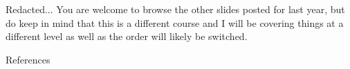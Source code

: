 \documentclass[11pt]{beamer}
\begin{document}
\begin{frame}{Redacted...}
  You are welcome to browse the other slides posted for last year, but do keep in mind that this is a different
  course and I will be covering things at a different level as well as the order will likely be switched.
\end{frame}

%

\begin{frame}[allowframebreaks]{References}
  
  
\end{frame}
\end{document}
